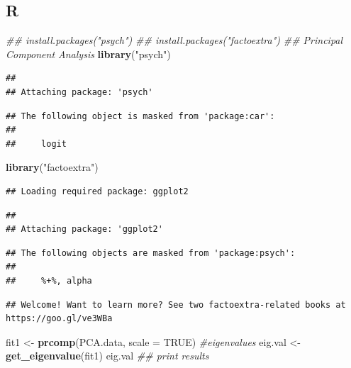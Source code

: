\documentclass[
]{book}
\newenvironment{Shaded}{\begin{snugshade}}{\end{snugshade}}
\newcommand{\CommentTok}[1]{\textcolor[rgb]{0.56,0.35,0.01}{\textit{#1}}}
\newcommand{\DataTypeTok}[1]{\textcolor[rgb]{0.13,0.29,0.53}{#1}}
\newcommand{\KeywordTok}[1]{\textcolor[rgb]{0.13,0.29,0.53}{\textbf{#1}}}
\newcommand{\NormalTok}[1]{#1}
\newcommand{\OtherTok}[1]{\textcolor[rgb]{0.56,0.35,0.01}{#1}}
\newcommand{\StringTok}[1]{\textcolor[rgb]{0.31,0.60,0.02}{#1}}
\begin{document}
\hypertarget{r}{%
\subsection{R}\label{r}}

\begin{Shaded}
\begin{Highlighting}[]
\CommentTok{## install.packages("psych")}
\CommentTok{## install.packages("factoextra")}
\CommentTok{## Principal Component Analysis}
\KeywordTok{library}\NormalTok{(}\StringTok{"psych"}\NormalTok{)}
\end{Highlighting}
\end{Shaded}

\begin{verbatim}
## 
## Attaching package: 'psych'
\end{verbatim}

\begin{verbatim}
## The following object is masked from 'package:car':
## 
##     logit
\end{verbatim}

\begin{Shaded}
\begin{Highlighting}[]
\KeywordTok{library}\NormalTok{(}\StringTok{"factoextra"}\NormalTok{)}
\end{Highlighting}
\end{Shaded}

\begin{verbatim}
## Loading required package: ggplot2
\end{verbatim}

\begin{verbatim}
## 
## Attaching package: 'ggplot2'
\end{verbatim}

\begin{verbatim}
## The following objects are masked from 'package:psych':
## 
##     %+%, alpha
\end{verbatim}

\begin{verbatim}
## Welcome! Want to learn more? See two factoextra-related books at https://goo.gl/ve3WBa
\end{verbatim}

\begin{Shaded}
\begin{Highlighting}[]
\NormalTok{fit1 <-}\StringTok{ }\KeywordTok{prcomp}\NormalTok{(PCA.data, }\DataTypeTok{scale =} \OtherTok{TRUE}\NormalTok{) }\CommentTok{#eigenvalues}
\NormalTok{eig.val <-}\StringTok{ }\KeywordTok{get_eigenvalue}\NormalTok{(fit1)}
\NormalTok{eig.val }\CommentTok{## print results}
\end{Highlighting}
\end{Shaded}
\end{document}

